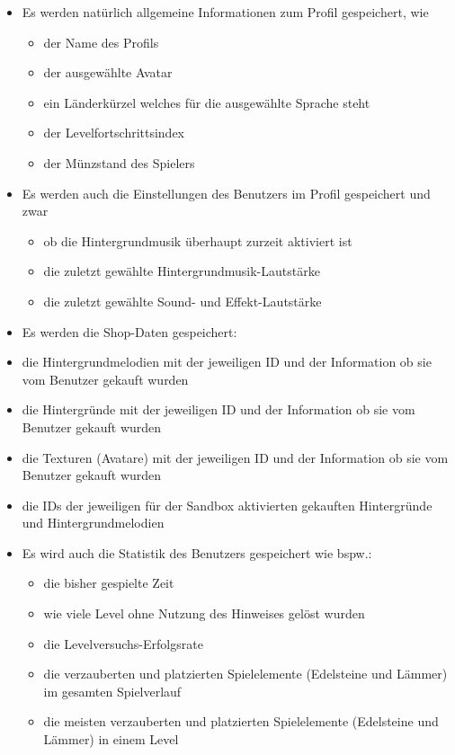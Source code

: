 \begin{itemize}
	\item Es werden natürlich allgemeine Informationen zum Profil gespeichert, wie 
	\begin{itemize}
		\item der Name des Profils
		\item der ausgewählte Avatar
		\item ein Länderkürzel welches für die ausgewählte Sprache steht
		\item der Levelfortschrittsindex
		\item der Münzstand des Spielers
	\end{itemize}
	\item Es werden auch die Einstellungen des Benutzers im Profil gespeichert und zwar
	\begin{itemize}
		\item ob die Hintergrundmusik überhaupt zurzeit aktiviert ist
		\item die zuletzt gewählte Hintergrundmusik-Lautstärke
		\item die zuletzt gewählte Sound- und Effekt-Lautstärke
	\end{itemize}
	\item Es werden die Shop-Daten gespeichert:
		\item die Hintergrundmelodien mit der jeweiligen ID und der Information ob sie vom Benutzer gekauft wurden
		\item die Hintergründe mit der jeweiligen ID und der Information ob sie vom Benutzer gekauft wurden
		\item die Texturen (Avatare) mit der jeweiligen ID und der Information ob sie vom Benutzer gekauft wurden
		\item die IDs der jeweiligen für der Sandbox aktivierten gekauften Hintergründe und Hintergrundmelodien
	\item Es wird auch die Statistik des Benutzers gespeichert wie bspw.:
	\begin{itemize}
		\item die bisher gespielte Zeit
		\item wie viele Level ohne Nutzung des Hinweises gelöst wurden
		\item die Levelversuchs-Erfolgsrate
		\item die verzauberten und platzierten Spielelemente (Edelsteine und Lämmer) im gesamten Spielverlauf 
		\item die meisten verzauberten und platzierten Spielelemente (Edelsteine und Lämmer) in einem Level
	\end{itemize}
\end{itemize}

